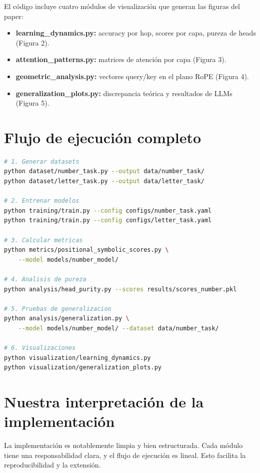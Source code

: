 \documentclass[12pt,a4paper,oneside]{report}
\begin{document}
El código incluye cuatro módulos de visualización que generan las figuras del paper:

\begin{itemize}
    \item \textbf{learning\_dynamics.py:} accuracy por hop, scores por capa, pureza de heads (Figura 2).
    \item \textbf{attention\_patterns.py:} matrices de atención por capa (Figura 3).
    \item \textbf{geometric\_analysis.py:} vectores query/key en el plano RoPE (Figura 4).
    \item \textbf{generalization\_plots.py:} discrepancia teórica y resultados de LLMs (Figura 5).
\end{itemize}

\section{Flujo de ejecución completo}

\begin{lstlisting}[language=bash]
# 1. Generar datasets
python dataset/number_task.py --output data/number_task/
python dataset/letter_task.py --output data/letter_task/

# 2. Entrenar modelos
python training/train.py --config configs/number_task.yaml
python training/train.py --config configs/letter_task.yaml

# 3. Calcular metricas
python metrics/positional_symbolic_scores.py \
    --model models/number_model/

# 4. Analisis de pureza
python analysis/head_purity.py --scores results/scores_number.pkl

# 5. Pruebas de generalizacion
python analysis/generalization.py \
    --model models/number_model/ --dataset data/number_task/

# 6. Visualizaciones
python visualization/learning_dynamics.py
python visualization/generalization_plots.py
\end{lstlisting}

\section{Nuestra interpretación de la implementación}

La implementación es notablemente limpia y bien estructurada. Cada módulo tiene una responsabilidad clara, y el flujo de ejecución es lineal. Esto facilita la reproducibilidad y la extensión.
\end{document}
